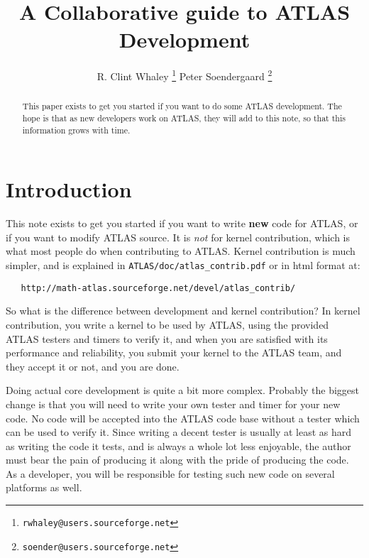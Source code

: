 \documentclass[11pt]{article}
\begin{document}
\begin{titlepage}
\title{A Collaborative guide to ATLAS Development}
\vspace{.4in}
\author
{
 R. Clint Whaley \thanks { {\tt rwhaley@users.sourceforge.net} }
 Peter Soendergaard \thanks { {\tt soender@users.sourceforge.net} }
}
\end{titlepage}
\maketitle
\begin{abstract}
This paper exists to get you started if you want to do some ATLAS development.
The hope is that as new developers work on ATLAS, they will add to this note,
so that this information grows with time.
\end{abstract}

\newpage
\tableofcontents

\newpage
\section{Introduction}
This note exists to get you started if you want to write {\bf new}
code for ATLAS, or if you want to modify ATLAS source.  It is {\em not}
for kernel contribution, which is what most people do when contributing to
ATLAS.  Kernel contribution is much simpler, and is explained in
{\tt ATLAS/doc/atlas\_contrib.pdf} or in html format at:
\begin{verbatim}
   http://math-atlas.sourceforge.net/devel/atlas_contrib/
\end{verbatim}

So what is the difference between development and kernel contribution?  
In kernel
contribution, you write a kernel to be used by ATLAS, using the provided
ATLAS testers and timers to verify it, and when you are satisfied with its
performance and reliability, you submit your kernel to the ATLAS team,
and they accept it or not, and you are done.

Doing actual core development is quite a bit more complex.  Probably the
biggest change is that you will need to write your own tester and timer
for your new code.  No code will be accepted into the ATLAS code base without
a tester which can be used to verify it.  Since writing a decent tester is
usually at least as hard as writing the code it tests, and is always a
whole lot less enjoyable, the author must bear the pain of producing it
along with the pride of producing the code.  As a developer, you will be
responsible for testing such new code on several platforms as well.
\end{document}
